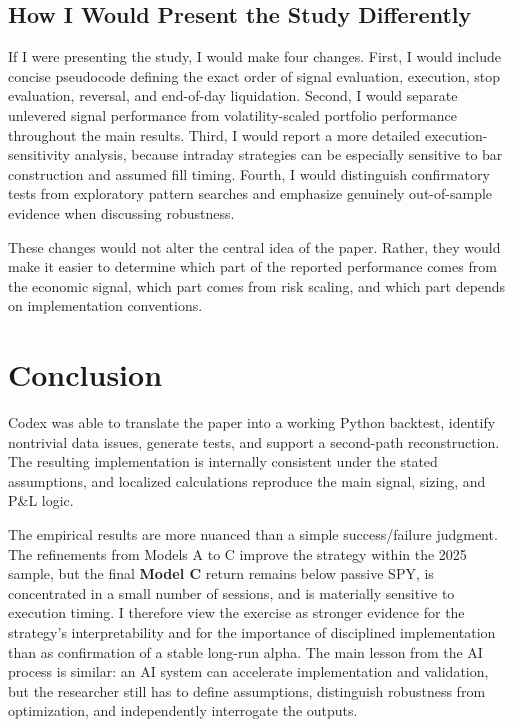 \documentclass{article}
\begin{document}
\subsection{How I Would Present the Study Differently}

If I were presenting the study, I would make four changes. First, I would include concise pseudocode defining the exact order of signal evaluation, execution, stop evaluation, reversal, and end-of-day liquidation. Second, I would separate unlevered signal performance from volatility-scaled portfolio performance throughout the main results. Third, I would report a more detailed execution-sensitivity analysis, because intraday strategies can be especially sensitive to bar construction and assumed fill timing. Fourth, I would distinguish confirmatory tests from exploratory pattern searches and emphasize genuinely out-of-sample evidence when discussing robustness.

These changes would not alter the central idea of the paper. Rather, they would make it easier to determine which part of the reported performance comes from the economic signal, which part comes from risk scaling, and which part depends on implementation conventions.

\section{Conclusion}

Codex was able to translate the paper into a working Python backtest, identify nontrivial data issues, generate tests, and support a second-path reconstruction. The resulting implementation is internally consistent under the stated assumptions, and localized calculations reproduce the main signal, sizing, and P\&L logic.

The empirical results are more nuanced than a simple success/failure judgment. The refinements from Models A to C improve the strategy within the 2025 sample, but the final\textbf{ Model C} return remains below passive SPY, is concentrated in a small number of sessions, and is materially sensitive to execution timing. I therefore view the exercise as stronger evidence for the strategy's interpretability and for the importance of disciplined implementation than as confirmation of a stable long-run alpha. The main lesson from the AI process is similar: an AI system can accelerate implementation and validation, but the researcher still has to define assumptions, distinguish robustness from optimization, and independently interrogate the outputs.
\end{document}

